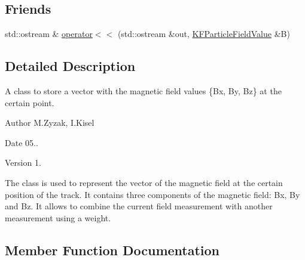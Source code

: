 \subsection*{Friends}
\begin{DoxyCompactItemize}
\item 
std\+::ostream \& \hyperlink{classKFParticleFieldValue_acef6a9757ec49d93f0750c100723f592}{operator$<$$<$} (std\+::ostream \&out, \hyperlink{classKFParticleFieldValue}{K\+F\+Particle\+Field\+Value} \&B)
\end{DoxyCompactItemize}


\subsection{Detailed Description}
A class to store a vector with the magnetic field values \{Bx, By, Bz\} at the certain point. 

\begin{DoxyAuthor}{Author}
M.\+Zyzak, I.\+Kisel 
\end{DoxyAuthor}
\begin{DoxyDate}{Date}
05.. 
\end{DoxyDate}
\begin{DoxyVersion}{Version}
1.
\end{DoxyVersion}
The class is used to represent the vector of the magnetic field at the certain position of the track. It contains three components of the magnetic field\+: Bx, By and Bz. It allows to combine the current field measurement with another measurement using a weight. 

\subsection{Member Function Documentation}
